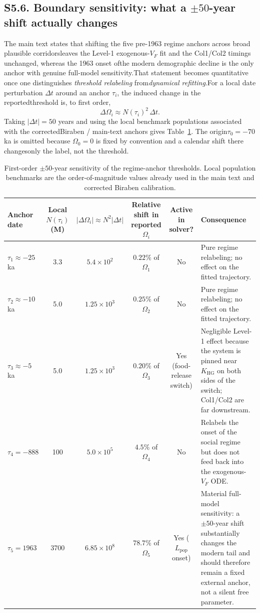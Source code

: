 \documentclass[11pt]{article}
\begin{document}
\subsection*{S5.6. Boundary sensitivity: what a $\pm 50$-year shift actually changes}\label{subsec:S5_boundary_sensitivity}
The main text states that shifting the five pre-1963 regime anchors across broad plausible corridorsleaves the Level-1 exogenous-$V_F$ fit and the Col1/Col2 timings unchanged, whereas the 1963 onset ofthe modern demographic decline is the only anchor with genuine full-model sensitivity.That statement becomes quantitative once one distinguishes \emph{threshold relabeling} from\emph{dynamical refitting}.For a local date perturbation $\Delta t$ around an anchor $\tau_i$, the induced change in the reportedthreshold is, to first order,\begin{equation}\Delta\Omega_i \approx N(\tau_i)^2\,\Delta t.\tag{S5.17}\label{eq:S5_dOmega}\end{equation}
Taking $|\Delta t|=50$ years and using the local benchmark populations associated with the correctedBiraben / main-text anchors gives Table~\ref{tab:S5_boundary_sensitivity}. The origin$\tau_0=-70$ ka is omitted because $\Omega_0=0$ is fixed by convention and a calendar shift there changesonly the label, not the threshold.\begin{table}[H]\centering\caption{First-order $\pm 50$-year sensitivity of the regime-anchor thresholds. Local population benchmarks are the order-of-magnitude values already used in the main text and corrected Biraben calibration.}\label{tab:S5_boundary_sensitivity}\begin{tabular}{lccccp{5.2cm}}\toprule
Anchor date & Local $N(\tau_i)$ (M) & $|\Delta\Omega_i|\approx N^2|\Delta t|$ & Relative shift in reported $\Omega_i$ & Active in solver? & Consequence \\\midrule
$\tau_1\approx -25$ ka & 3.3 & $5.4\times 10^2$ & $0.22\%$ of $\Omega_1$ & No & Pure regime relabeling; no effect on the fitted trajectory. \\
$\tau_2\approx -10$ ka & 5.0 & $1.25\times 10^3$ & $0.25\%$ of $\Omega_2$ & No & Pure regime relabeling; no effect on the fitted trajectory. \\
$\tau_3\approx -5$ ka & 5.0 & $1.25\times 10^3$ & $0.20\%$ of $\Omega_3$ & Yes (food-release switch) & Negligible Level-1 effect because the system is pinned near $K_{\mathrm{HG}}$ on both sides of the switch; Col1/Col2 are far downstream. \\
$\tau_4=-888$ & 100 & $5.0\times 10^5$ & $4.5\%$ of $\Omega_4$ & No & Relabels the onset of the social regime but does not feed back into the exogenous-$V_F$ ODE. \\
$\tau_5=1963$ & 3700 & $6.85\times 10^8$ & $78.7\%$ of $\Omega_5$ & Yes ($L_{\mathrm{pop}}$ onset) & Material full-model sensitivity: a $\pm 50$-year shift substantially changes the modern tail and should therefore remain a fixed external anchor, not a silent free parameter. \\\bottomrule
\end{tabular}\end{table}
\end{document}
